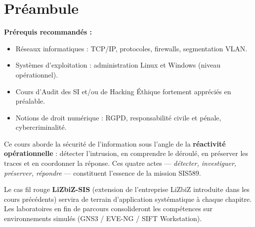 \documentclass[12pt, a4paper, twoside, openright]{book}
\begin{document}
\chapter*{Préambule}

\begin{boxinfo}
\textbf{Prérequis recommandés :}
\begin{itemize}
    \item Réseaux informatiques : TCP/IP, protocoles, firewalls, segmentation VLAN.
    \item Systèmes d'exploitation : administration Linux et Windows (niveau opérationnel).
    \item Cours d'Audit des SI et/ou de Hacking Éthique fortement appréciés en préalable.
    \item Notions de droit numérique : RGPD, responsabilité civile et pénale, cybercriminalité.
\end{itemize}
\end{boxinfo}

\medskip

Ce cours aborde la sécurité de l'information sous l'angle de la \textbf{réactivité
opérationnelle} : détecter l'intrusion, en comprendre le déroulé, en préserver les
traces et en coordonner la réponse. Ces quatre actes — \textit{détecter, investiguer,
préserver, répondre} — constituent l'essence de la mission SIS589.

Le cas fil rouge \textbf{LiZbiZ-SIS} (extension de l'entreprise LiZbiZ introduite
dans les cours précédents) servira de terrain d'application systématique à chaque
chapitre. Les laboratoires en fin de parcours consolideront les compétences
sur environnements simulés (GNS3 / EVE-NG / SIFT Workstation).


\clearpage
\tableofcontents

\clearpage
\listoffigures
{}

\listoftables
{}

\lstlistoflistings
{}


\mainmatter
\end{document}
